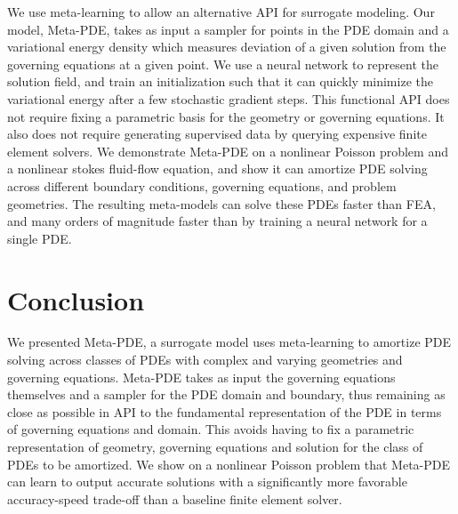 \documentclass{puthesis}
\begin{document}
We use meta-learning to allow an alternative API for surrogate modeling.
Our model, Meta-PDE, takes as input a sampler for points in the PDE domain and
a variational energy density which measures deviation of a
given solution from the governing equations at a given point.
We use a neural network to represent the solution field, and train an initialization such that
it can quickly minimize the variational energy after a few stochastic gradient steps.
This functional API does not require fixing a parametric basis for the geometry or
governing equations.
It also does not require generating supervised data by
querying expensive finite element solvers.
We demonstrate Meta-PDE on a nonlinear Poisson problem and a nonlinear stokes
fluid-flow equation, and show it can amortize PDE solving
across different boundary conditions, governing equations,
and problem geometries.
The resulting meta-models can solve these PDEs faster than FEA,
and many orders of magnitude faster than by
training a neural network for a single PDE.







% 
\section{Conclusion}
We presented Meta-PDE, a surrogate model uses meta-learning to amortize PDE solving
across classes of PDEs with complex and varying geometries and governing equations.
Meta-PDE takes as input the governing equations themselves and a sampler for the
PDE domain and boundary, thus remaining as close as possible in API to the fundamental
representation of the PDE in terms of governing equations and domain.
This avoids having to fix a parametric representation of geometry, governing equations
and solution for the class of PDEs to be amortized.
We show on a nonlinear Poisson problem that Meta-PDE can learn to output accurate
solutions with a significantly more favorable accuracy-speed trade-off than
a baseline finite element solver.
\end{document}
